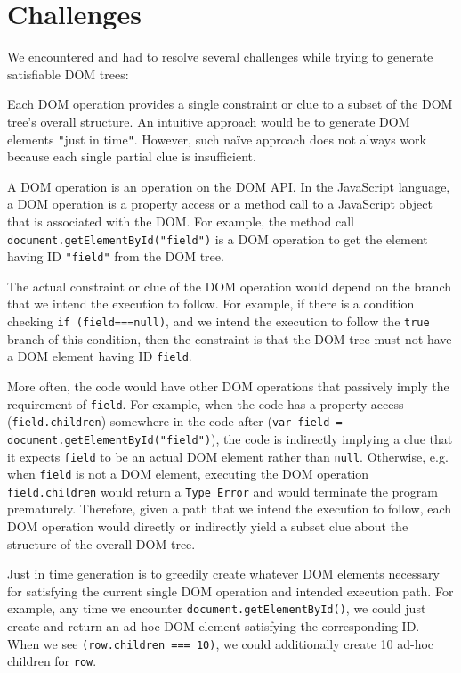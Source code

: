 \section{Challenges}
We encountered and had to resolve several challenges while trying to generate satisfiable DOM trees:


Each DOM operation provides a single constraint or clue to a subset of the DOM tree's overall structure.  An intuitive approach would be to generate DOM elements {\tt "}just in time{\tt "}.  
However, such na\"ive approach does not always work because each single partial clue is insufficient.  

A DOM operation is an operation on the DOM API.  In the JavaScript language, a DOM operation is a property access or a method call to a JavaScript object that is associated with the DOM.  
For example, the method call {\tt document.getElementById("field")} is a DOM operation to get the element having ID {\tt "field"} from the DOM tree.  

The actual constraint or clue of the DOM operation would depend on the branch that we intend the execution to follow.  
For example, if there is a condition checking {\tt if (field===null)}, and we intend the execution to follow the {\tt true} branch of this condition,  
then the constraint is that the DOM tree must not have a DOM element having ID {\tt field}.  

More often, the code would have other DOM operations that passively imply the requirement of {\tt field}.  
For example, when the code has a property access ({\tt field.children}) somewhere in the code after ({\tt var field = document.getElementById("field")}), 
the code is indirectly implying a clue that it expects {\tt field} to be an actual DOM element rather than {\tt null}.  
Otherwise, e.g. when {\tt field} is not a DOM element, executing the DOM operation {\tt field.children} would return a {\tt Type Error} and would terminate the program prematurely.    
Therefore, given a path that we intend the execution to follow, each DOM operation would directly or indirectly yield a subset clue about the structure of the overall DOM tree.  

Just in time generation is to greedily create whatever DOM elements necessary for satisfying the current single DOM operation and intended execution path.    
For example, any time we encounter {\tt document.getElementById()}, we could just create and return an ad-hoc DOM element satisfying the corresponding ID.  
When we see {\tt (row.children === 10)}, we could additionally create 10 ad-hoc children for {\tt row}.  

